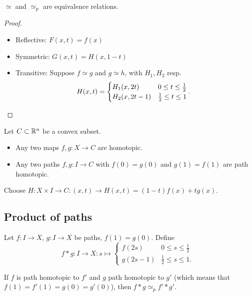 \begin{lemma}
    $\simeq$ and  $\simeq_p$ are equivalence relations.
\end{lemma}
\begin{proof}
    \leavevmode
    \begin{itemize}
        \item Reflective: $F(x, t) = f(x)$
        \item Symmetric: $G(x, t) = H(x, 1-t)$ 
        \item Transitive:  Suppose $f \simeq g$ and  $g \simeq h$, with  $H_1, H_2$ resp.
            \[
                H(x, t) = \begin{cases}
                    H_1(x, 2t) & 0 \le t \le  \frac{1}{2}\\
                    H_2(x, 2t-1) & \frac{1}{2} \le  t \le  1
                \end{cases}
            . \qedhere
        \] 
    \end{itemize}
\end{proof}


\begin{eg}
   Let $C \subset \mathbb{R}^n$ be a convex subset.
   \begin{itemize}
       \item Any two maps $f, g: X \to C$ are homotopic.
       \item Any two paths $f, g: I \to  C$ with $f(0) = g(0)$ and  $g(1) = f(1)$ are path homotopic.
   \end{itemize}

   Choose $H: X \times I \to  C: (x, t) \to  H(x, t) = (1-t) f(x) + t g(x)$.
\end{eg}


\subsection*{Product of paths}
Let $f: I\to X$, $g: I \to X$ be paths, $f(1) = g(0)$.
Define  \[
    f*g: I \to X: s \mapsto \begin{cases}
        f(2s) & 0 \le  s \le  \frac{1}{2}\\
        g(2s - 1) & \frac{1}{2}\le s\le 1.
\end{cases}
\]
\begin{remark}
    If $f$ is path homotopic to $f'$ and $g$ path homotopic to $g'$ (which means that $f(1) = f'(1) = g(0) = g'(0)$), then $f * g \simeq_p f' * g'$.
\end{remark}

